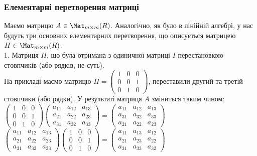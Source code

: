 \documentclass{math_library}
\begin{document}
\subsubsection*{Елементарні перетворення матриці}
Маємо матрицю $A \in \Mat_{m \times m}(R)$. Аналогічно, як було в лінійній алгебрі, у нас будуть три основних елементарних перетворення, що описується матрицею $H \in \Mat_{m \times m}(R)$.\\
1. Матриця $H$, що була отримана з одиничної матриці $I$ перестановкою стовпчиків (або рядків, не суть).\\
На прикладі маємо матрицю $H = \begin{pmatrix}
1 & 0 & 0 \\
0 & 0 & 1 \\
0 & 1 & 0
\end{pmatrix}$, переставили другий та третій стовпчики (або рядки). У результаті матриця $A$ зміниться таким чином:\\
$\begin{pmatrix}
1 & 0 & 0 \\
0 & 0 & 1 \\
0 & 1 & 0
\end{pmatrix} \begin{pmatrix}
a_{11} & a_{12} & a_{13} \\
a_{21} & a_{22} & a_{23} \\
a_{31} & a_{32} & a_{33} 
\end{pmatrix} = \begin{pmatrix}
a_{11} & a_{12} & a_{13} \\
a_{31} & a_{32} & a_{33} \\
a_{21} & a_{22} & a_{23}
\end{pmatrix}$\\
$\begin{pmatrix}
a_{11} & a_{12} & a_{13} \\
a_{21} & a_{22} & a_{23} \\
a_{31} & a_{32} & a_{33} 
\end{pmatrix} \begin{pmatrix}
1 & 0 & 0 \\
0 & 0 & 1 \\
0 & 1 & 0
\end{pmatrix} = \begin{pmatrix}
a_{11} & a_{13} & a_{12} \\
a_{21} & a_{23} & a_{22} \\
a_{31} & a_{33} & a_{32}
\end{pmatrix}$
\bigskip \\
\end{document}
